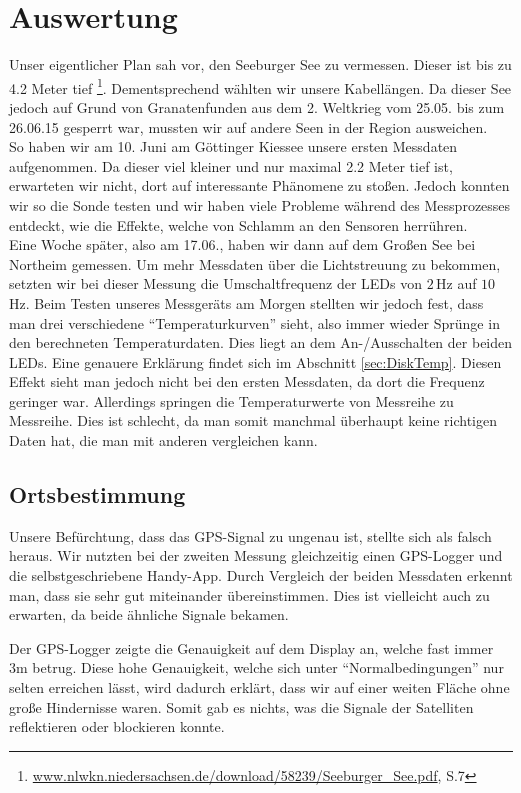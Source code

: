 \documentclass[12pt,a4paper,titlepage,headinclude,bibtotoc]{scrartcl}
\numberwithin{equation}{subsection}
\begin{document}
\section{Auswertung}
\label{sec:auswertung}

Unser eigentlicher Plan sah vor, den Seeburger See zu vermessen.
Dieser ist bis zu 4.2 Meter tief \footnote{\url{www.nlwkn.niedersachsen.de/download/58239/Seeburger\_See.pdf}, S.7}.
Dementsprechend wählten wir unsere Kabellängen.
Da dieser See jedoch auf Grund von Granatenfunden aus dem 2. Weltkrieg vom 25.05. bis zum 26.06.15 gesperrt war, mussten wir auf andere Seen in der Region ausweichen.\\
So haben wir am 10. Juni am Göttinger Kiessee unsere ersten Messdaten aufgenommen.
Da dieser viel kleiner und nur maximal 2.2 Meter tief ist, erwarteten wir nicht, dort auf interessante Phänomene zu stoßen.
Jedoch konnten wir so die Sonde testen und wir haben viele Probleme während des Messprozesses entdeckt, wie die Effekte, welche von Schlamm an den Sensoren herrühren.\\
Eine Woche später, also am 17.06., haben wir dann auf dem Großen See bei Northeim gemessen.
Um mehr Messdaten über die Lichtstreuung zu bekommen, setzten wir bei dieser Messung die Umschaltfrequenz der LEDs von $2\,$Hz auf $10\,$Hz.
Beim Testen unseres Messgeräts am Morgen stellten wir jedoch fest, dass man drei verschiedene "`Temperaturkurven"' sieht, also immer wieder Sprünge in den berechneten Temperaturdaten.
Dies liegt an dem An-/Ausschalten der beiden LEDs.
Eine genauere Erklärung findet sich im Abschnitt \ref{sec:DiskTemp}.
Diesen Effekt sieht man jedoch nicht bei  den ersten Messdaten, da dort die Frequenz geringer war.
Allerdings springen die Temperaturwerte von Messreihe zu Messreihe.
Dies ist schlecht, da man somit manchmal überhaupt keine richtigen Daten hat, die man mit anderen vergleichen kann.

\subsection{Ortsbestimmung}
\label{sec:ausort}
Unsere Befürchtung, dass das GPS-Signal zu ungenau ist, stellte sich als falsch heraus.
Wir nutzten bei der zweiten Messung gleichzeitig einen GPS-Logger und die selbstgeschriebene Handy-App.
Durch Vergleich der beiden Messdaten erkennt man, dass sie sehr gut miteinander übereinstimmen.
Dies ist vielleicht auch zu erwarten, da beide ähnliche Signale bekamen.

Der GPS-Logger zeigte die Genauigkeit auf dem Display an, welche fast immer 3m betrug.
Diese hohe Genauigkeit, welche sich unter "`Normalbedingungen"' nur selten erreichen lässt, wird dadurch erklärt, dass wir auf einer weiten Fläche ohne große Hindernisse waren.
Somit gab es nichts, was die Signale der Satelliten reflektieren oder blockieren konnte.
\end{document}
